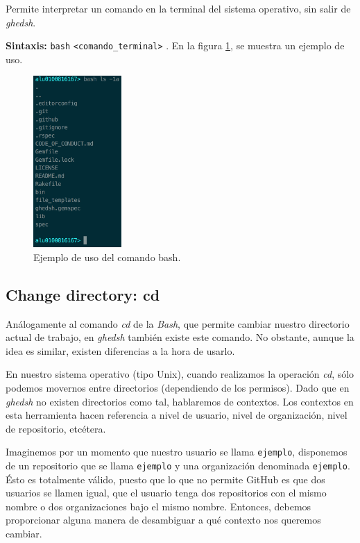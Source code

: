 Permite interpretar un comando en la terminal del sistema operativo, sin salir de {\it ghedsh}.
\bigskip

\textbf{Sintaxis:} \verb|bash| \verb|<comando_terminal>| .
En la figura \ref{fig:bash-example}, se muestra un ejemplo de uso.
\begin{figure}[H]
	\begin{center}
	\includegraphics[width=0.30\textwidth]{images/bash-example.png}
	\caption{Ejemplo de uso del comando bash.}
	\label{fig:bash-example}
	\end{center}
\end{figure}

\subsection{Change directory: cd}
\label{3.2.2}
Análogamente al comando {\it cd} de la {\it Bash}\cite{B17}, que permite cambiar nuestro directorio actual de trabajo, en {\it ghedsh} también existe este comando. No obstante, aunque la idea es similar, existen diferencias a la hora de usarlo.
\bigskip

En nuestro sistema operativo (tipo Unix)\cite{B18}, cuando realizamos la operación {\it cd}, sólo podemos movernos entre directorios (dependiendo de los permisos). Dado que en {\it ghedsh} no existen directorios como tal, hablaremos de contextos.
Los contextos en esta herramienta hacen referencia a nivel de usuario, nivel de organización, nivel de repositorio, etcétera.
\bigskip

Imaginemos por un momento que nuestro usuario se llama \verb|ejemplo|, disponemos de un repositorio que se llama \verb|ejemplo| y una organización denominada \verb|ejemplo|. Ésto es totalmente válido, puesto que lo que no permite GitHub es que dos usuarios se llamen igual, que el usuario tenga dos repositorios con el mismo nombre o dos organizaciones bajo el mismo nombre.
Entonces, debemos proporcionar alguna manera de desambiguar a qué contexto nos queremos cambiar.
\bigskip

